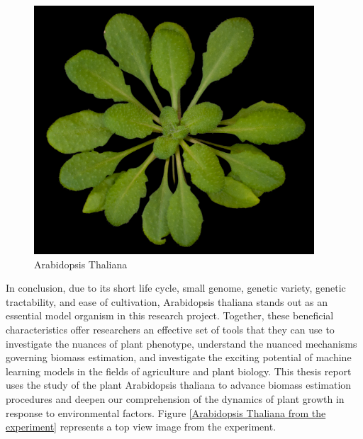 \documentclass[a4paper,12pt]{report}%
\renewcommand{\\}{\vspace*{0.5\baselineskip} \newline}
\begin{document}
\begin{figure}[h]
\centering
	\includegraphics[scale=0.8]{images/arabidopsis single.png}\\
	\begin{footnotesize}
		\caption{Arabidopsis Thaliana \cite{14}}
		\label{arabidopsis single}
	\end{footnotesize}
\end{figure}

\noindent In conclusion, due to its short life cycle, small genome, genetic variety, genetic tractability, and ease of cultivation, Arabidopsis thaliana stands out as an essential model organism in this research project. Together, these beneficial characteristics offer researchers an effective set of tools that they can use to investigate the nuances of plant phenotype, understand the nuanced mechanisms governing biomass estimation, and investigate the exciting potential of machine learning models in the fields of agriculture and plant biology. This thesis report uses the study of the plant Arabidopsis thaliana to advance biomass estimation procedures and deepen our comprehension of the dynamics of plant growth in response to environmental factors. Figure \ref{Arabidopsis Thaliana from the experiment} represents a top view image from the experiment.
\end{document}
